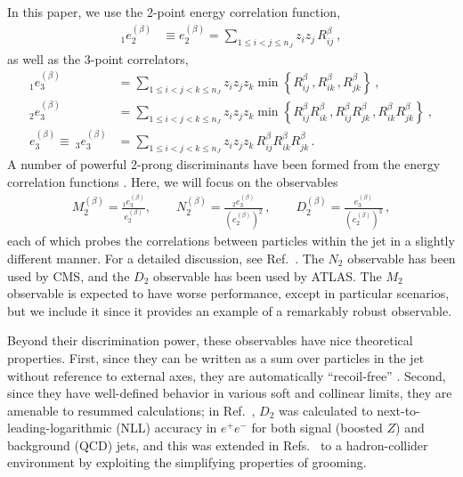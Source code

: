 \documentclass[11pt,letterpaper]{article}
\begin{document}
In this paper, we use the 2-point energy correlation function,
\begin{align}\label{jetsub_2prong_eq:explicit_twopointvar}
_1e_2^{(\beta)}&\equiv e_2^{(\beta)}=\sum_{1\leq i<j\leq n_J} z_{i}z_{j} \, R_{ij}^\beta\ ,
\end{align}
as well as the 3-point correlators,
\begin{align}\label{jetsub_2prong_eq:explicit_ecfvar}
_1e_{3}^{(\beta)}&=\sum_{1\leq i<j<k\leq n_J} z_{i}z_{j}z_{k} \min \left\{ R_{ij}^\beta\,,  R_{ik}^\beta\,, R_{jk}^\beta  \right\} \ , \nonumber \\
_2e_{3}^{(\beta)}&=\sum_{1\leq i<j<k\leq n_J} z_{i}z_{j}z_{k} \min \left\{R_{ij}^\beta R_{ik}^\beta\,, R_{ij}^\beta  R_{jk}^\beta\,,     R_{ik}^\beta R_{jk}^\beta    \right\}  \ , \nonumber \\
e_{3}^{(\beta)}\equiv ~_3e_{3}^{(\beta)}&=\sum_{1\leq i<j<k\leq n_J} z_{i}z_{j}z_{k} \, R_{ij}^\beta R_{ik}^\beta R_{jk}^\beta \,.
\end{align}
%
A number of powerful 2-prong discriminants have been formed from the energy correlation functions  \cite{Larkoski:2013eya,Larkoski:2014gra,Larkoski:2014zma,Moult:2016cvt}.  Here, we will focus on the observables
\begin{align}
 M_2^{(\beta)} = \frac{_1e_{3}^{(\beta)}}{e_{2}^{(\beta)}}, \qquad  N_2^{(\beta)} = \frac{_2e_{3}^{(\beta)}}{(e_{2}^{(\beta)})^2}\,, \qquad  D_{2}^{(\beta)}=\frac{e_{3}^{(\beta)}}{(e_{2}^{(\beta)})^{3}}\,, 
\end{align}
each of which probes the correlations between particles within the jet in a slightly different manner.
%
For a detailed discussion, see Ref.~\cite{Moult:2016cvt}.
%
The $N_2$ observable has been used by CMS, and the $D_2$ observable has been used by ATLAS.
%
The $M_2$ observable is expected to have worse performance, except in particular scenarios, but we include it since it provides an example of a remarkably robust observable.

Beyond their discrimination power, these observables have nice theoretical properties.
%
First, since they can be written as a sum over particles in the jet without reference to external axes, they are automatically ``recoil-free'' \cite{Catani:1992jc,Dokshitzer:1998kz,Banfi:2004yd,Larkoski:2013eya,Larkoski:2014uqa}.
%
Second, since they have well-defined behavior in various soft and collinear limits, they are amenable to resummed calculations;  in Ref.~\cite{Larkoski:2015kga}, $D_2$ was calculated to next-to-leading-logarithmic (NLL) accuracy in $e^+e^-$ for both signal (boosted $Z$) and background (QCD) jets, and this was extended in Refs.~\cite{Larkoski:2017iuy,Larkoski:2017cqq} to a hadron-collider environment by exploiting the simplifying properties of grooming.
\end{document}
